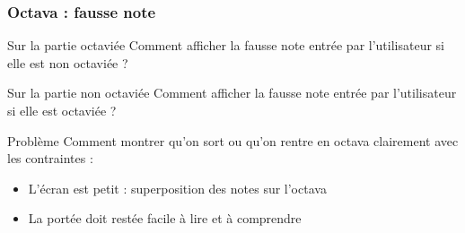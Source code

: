 \documentclass{beamer}
\begin{document}
\begin{frame}
	\frametitle{Octava : fausse note}

	\begin{block}{Sur la partie octaviée}
  	Comment afficher la fausse note entrée par l'utilisateur si elle est non octaviée ?
	\end{block}

	\begin{block}{Sur la partie non octaviée}
  	Comment afficher la fausse note entrée par l'utilisateur si elle est octaviée ?
	\end{block}


	\begin{block}{Problème}
	  Comment montrer qu'on sort ou qu'on rentre en octava clairement avec les contraintes :
	\begin{itemize}
		\item L'écran est petit : superposition des notes sur l'octava
		\item La portée doit restée facile à lire et à comprendre
	\end{itemize}
	\end{block}
\end{frame}
\end{document}
